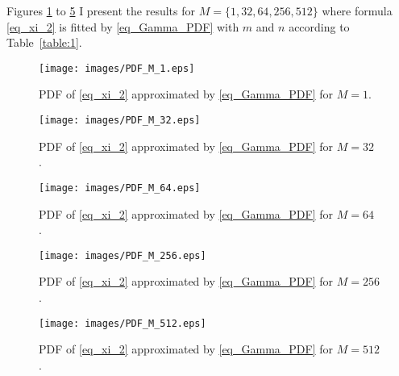 \documentclass{article}
\begin{document}
Figures \ref{fig_PDF_M1} to \ref{fig_PDF_M512} I present the results for $M = \{1,32,64,256,512\}$ where formula \eqref{eq_xi_2} is fitted by \eqref{eq_Gamma_PDF} with $m$ and $n$ according to Table~\ref{table:1}.


\begin{figure}[!h] \centering
\texttt{[image: images/PDF\_M\_1.eps]}
\caption{PDF of \eqref{eq_xi_2} approximated by \eqref{eq_Gamma_PDF} for $M=1$. }
\label{fig_PDF_M1}
\end{figure}

\begin{figure}[!h] \centering
\texttt{[image: images/PDF\_M\_32.eps]}
\caption{PDF of \eqref{eq_xi_2} approximated by \eqref{eq_Gamma_PDF} for $M=32$ . }
\label{fig_PDF_M32}
\end{figure}

\begin{figure}[!h] \centering
\texttt{[image: images/PDF\_M\_64.eps]}
\caption{PDF of \eqref{eq_xi_2} approximated by \eqref{eq_Gamma_PDF} for $M=64$ . }
\label{fig_PDF_M64}
\end{figure}

\begin{figure}[!h] \centering
\texttt{[image: images/PDF\_M\_256.eps]}
\caption{PDF of \eqref{eq_xi_2} approximated by \eqref{eq_Gamma_PDF} for $M=256$ . }
\label{fig_PDF_M256}
\end{figure}

\begin{figure}[!h] \centering
\texttt{[image: images/PDF\_M\_512.eps]}
\caption{PDF of \eqref{eq_xi_2} approximated by \eqref{eq_Gamma_PDF} for $M=512$ . }
\label{fig_PDF_M512}
\end{figure}


\end{document}
